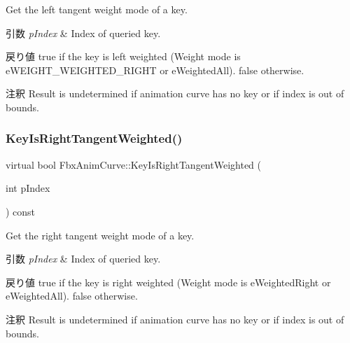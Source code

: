 Get the left tangent weight mode of a key. 
\begin{DoxyParams}{引数}
{\em p\+Index} & Index of queried key. \\
\hline
\end{DoxyParams}
\begin{DoxyReturn}{戻り値}
{\ttfamily true} if the key is left weighted (Weight mode is e\+W\+E\+I\+G\+H\+T\+\_\+\+W\+E\+I\+G\+H\+T\+E\+D\+\_\+\+R\+I\+G\+HT or e\+Weighted\+All). {\ttfamily false} otherwise. 
\end{DoxyReturn}
\begin{DoxyRemark}{注釈}
Result is undetermined if animation curve has no key or if index is out of bounds. 
\end{DoxyRemark}
\mbox{\label{class_fbx_anim_curve_af82ac790cdd052063e2c8dbd45ea54ca}} 
\subsubsection{\texorpdfstring{Key\+Is\+Right\+Tangent\+Weighted()}{KeyIsRightTangentWeighted()}}
{\footnotesize\ttfamily virtual bool Fbx\+Anim\+Curve\+::\+Key\+Is\+Right\+Tangent\+Weighted (\begin{DoxyParamCaption}\item[{int}]{p\+Index }\end{DoxyParamCaption}) const\hspace{0.3cm}{\ttfamily [pure virtual]}}

Get the right tangent weight mode of a key. 
\begin{DoxyParams}{引数}
{\em p\+Index} & Index of queried key. \\
\hline
\end{DoxyParams}
\begin{DoxyReturn}{戻り値}
{\ttfamily true} if the key is right weighted (Weight mode is e\+Weighted\+Right or e\+Weighted\+All). {\ttfamily false} otherwise. 
\end{DoxyReturn}
\begin{DoxyRemark}{注釈}
Result is undetermined if animation curve has no key or if index is out of bounds. 
\end{DoxyRemark}
\mbox{\label{class_fbx_anim_curve_ac75a9aaa2edc08635c0a9fadbd628923}} 
